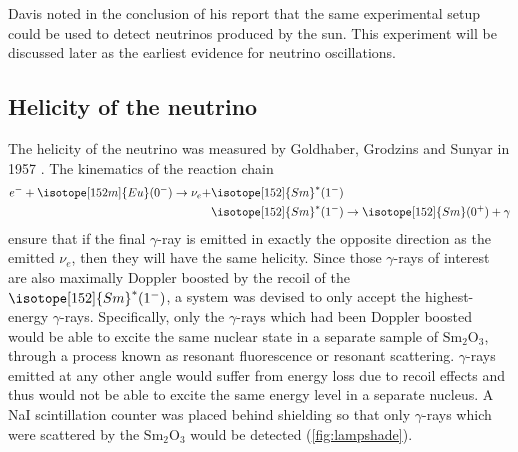Davis noted in the conclusion of his report that the same experimental setup
could be used to detect neutrinos produced by the sun.
This experiment will be discussed later as the earliest evidence
for neutrino oscillations.

\subsection{Helicity of the neutrino}
\label{subsec:helicity}

The helicity of the neutrino was measured by
Goldhaber, Grodzins and Sunyar in 1957 \cite{helicity_measurement,helicity_review}.
The kinematics of the reaction chain
\begin{align}\label{eq:lampshade}
    \begin{split}
        e^- + \isotope[152m]{Eu}(0^-) \to \nu_e
        + & \isotope[152]{Sm}^*(1^-) \\
          & \isotope[152]{Sm}^*(1^-) \to \isotope[152]{Sm}(0^+) + \gamma
    \end{split}
\end{align}
ensure that if the final $\gamma$-ray is emitted
in exactly the opposite direction as the emitted $\nu_e$,
then they will have the same helicity.
Since those $\gamma$-rays of interest
are also maximally Doppler boosted by the recoil of the $\isotope[152]{Sm}^*(1^-)$,
a system was devised to only accept the highest-energy $\gamma$-rays.
Specifically, only the $\gamma$-rays which had been Doppler boosted
would be able to excite the same nuclear state in a separate sample of
$\text{Sm}_2\text{O}_3$,
through a process known as resonant fluorescence or resonant scattering.
$\gamma$-rays emitted at any other angle would suffer from energy loss
due to recoil effects
and thus would not be able to excite the same energy level in a separate nucleus.
A NaI scintillation counter was placed behind shielding
so that only $\gamma$-rays which were scattered by the $\text{Sm}_2\text{O}_3$
would be detected (\cref{fig:lampshade}).

